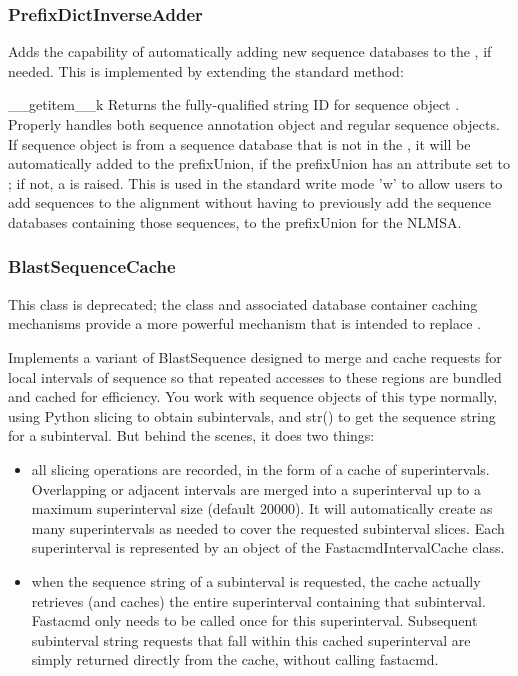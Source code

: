 \documentclass{howto}
\begin{document}
\subsubsection{PrefixDictInverseAdder}
Adds the capability of automatically adding new sequence databases to the
, if needed.  This is implemented by extending
the standard  method:
\begin{funcdesc}{__getitem__}{k}
  Returns the fully-qualified string ID for sequence object .  
  Properly handles both sequence annotation object and regular sequence
  objects.  If sequence object  is from a sequence database that
  is not in the , it will be automatically added
  to the prefixUnion, if the prefixUnion has an  attribute
  set to ; if not, a  is raised.
  This is used in the standard  write mode 'w'
  to allow users to add sequences to the alignment without having to 
  previously add the sequence databases containing those sequences, 
  to the prefixUnion for the NLMSA.
\end{funcdesc}



\subsubsection{BlastSequenceCache}

This class is deprecated; the  class and associated
database container caching mechanisms provide a more powerful mechanism
that is intended to replace .

Implements a variant of BlastSequence designed to merge and cache requests for local intervals of sequence so that repeated accesses to these regions are bundled and cached for efficiency.  You work with sequence objects of this type normally, using Python slicing to obtain subintervals, and str() to get the sequence string for a subinterval.  But behind the scenes, it does two things:

\begin{itemize}
\item
all slicing operations are recorded, in the form of a cache of superintervals.  Overlapping or adjacent intervals are merged into a superinterval up to a maximum superinterval size (default 20000).  It will automatically create as many superintervals as needed to cover the requested subinterval slices.  Each superinterval is represented by an object of the FastacmdIntervalCache class.

\item 
when the sequence string of a subinterval is requested, the cache actually retrieves (and caches) the entire superinterval containing that subinterval.  Fastacmd only needs to be called once for this superinterval.  Subsequent subinterval string requests that fall within this cached superinterval are simply returned directly from the cache, without calling fastacmd.

\end{itemize}
\end{document}
